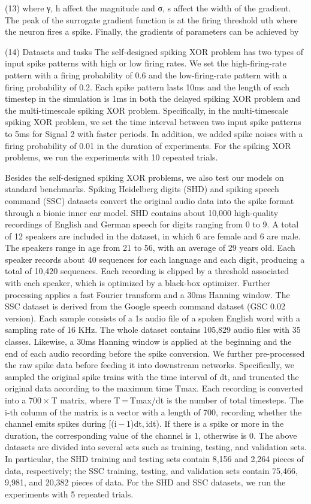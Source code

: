 (13)
where γ, h affect the magnitude and σ, s affect the width of the gradient. The peak of the surrogate gradient function is at the firing threshold uth where the neuron fires a spike. Finally, the gradients of parameters can be achieved by

(14)
Datasets and tasks
The self-designed spiking XOR problem has two types of input spike patterns with high or low firing rates. We set the high-firing-rate pattern with a firing probability of 0.6 and the low-firing-rate pattern with a firing probability of 0.2. Each spike pattern lasts 10ms and the length of each timestep in the simulation is 1ms in both the delayed spiking XOR problem and the multi-timescale spiking XOR problem. Specifically, in the multi-timescale spiking XOR problem, we set the time interval between two input spike patterns to 5ms for Signal 2 with faster periods. In addition, we added spike noises with a firing probability of 0.01 in the duration of experiments. For the spiking XOR problems, we run the experiments with 10 repeated trials.

Besides the self-designed spiking XOR problems, we also test our models on standard benchmarks. Spiking Heidelberg digits (SHD) and spiking speech command (SSC) datasets convert the original audio data into the spike format through a bionic inner ear model. SHD contains about 10,000 high-quality recordings of English and German speech for digits ranging from 0 to 9. A total of 12 speakers are included in the dataset, in which 6 are female and 6 are male. The speakers range in age from 21 to 56, with an average of 29 years old. Each speaker records about 40 sequences for each language and each digit, producing a total of 10,420 sequences. Each recording is clipped by a threshold associated with each speaker, which is optimized by a black-box optimizer. Further processing applies a fast Fourier transform and a 30ms Hanning window. The SSC dataset is derived from the Google speech command dataset (GSC 0.02 version). Each sample consists of a 1s audio file of a spoken English word with a sampling rate of 16 KHz. The whole dataset contains 105,829 audio files with 35 classes. Likewise, a 30ms Hanning window is applied at the beginning and the end of each audio recording before the spike conversion. We further pre-processed the raw spike data before feeding it into downstream networks. Specifically, we sampled the original spike trains with the time interval of dt, and truncated the original data according to the maximum time Tmax. Each recording is converted into a 700 × T matrix, where T = Tmax/dt is the number of total timesteps. The i-th column of the matrix is a vector with a length of 700, recording whether the channel emits spikes during [(i − 1)dt, idt). If there is a spike or more in the duration, the corresponding value of the channel is 1, otherwise is 0. The above datasets are divided into several sets such as training, testing, and validation sets. In particular, the SHD training and testing sets contain 8,156 and 2,264 pieces of data, respectively; the SSC training, testing, and validation sets contain 75,466, 9,981, and 20,382 pieces of data. For the SHD and SSC datasets, we run the experiments with 5 repeated trials.

